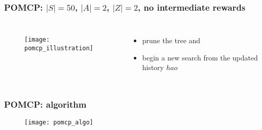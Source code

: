 \begin{frame}
\frametitle{POMCP: $|S|= 50$, $|A|=2$, $|Z|=2$, {\small no intermediate rewards}}
\begin{columns}
    \begin{figure}
        \centering
        \texttt{[image: pomcp\_illustration]}
    \end{figure}
    \begin{itemize}
        \item prune the tree and
        \item begin a new search from the updated history $hao$
    \end{itemize}
\end{columns}
\end{frame}

\begin{frame}
\frametitle{POMCP: algorithm}
\begin{figure}
    \centering
    \texttt{[image: pomcp\_algo]}
\end{figure}
\end{frame}
